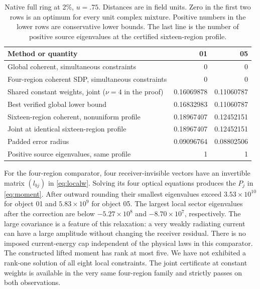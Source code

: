 \documentclass[anonymous,12pt]{iopjournal}
\theoremstyle{remark}\newtheorem{remark}[theorem]{Remark}
\numberwithin{equation}{section}
\begin{document}
\begin{table}[tb]
\caption{Native full ring at 2\%, $u=.75$. Distances are in field units. Zero in the first two rows is an optimum for every unit complex mixture. Positive numbers in the lower rows are conservative lower bounds. The last line is the number of positive source eigenvalues at the certified sixteen-region profile.}\label{tab:compare}
\centering\begin{tabular}{@{}>{\raggedright\arraybackslash}p{.49\linewidth}rr@{}}\toprule
Method or quantity & 01 & 05\\ \midrule
Global coherent, simultaneous constraints &0&0\\
Four-region coherent SDP, simultaneous constraints &0&0\\
Shared constant weights, joint ($\nu=4$ in the proof) &0.16069878&0.11060787\\
Best verified global lower bound &0.16832983&0.11060787\\
Sixteen-region coherent, nonuniform profile &0.18967407&0.12452151\\
Joint at identical sixteen-region profile &0.18967407&0.12452151\\
Padded error radius &0.09096764&0.08802506\\
Positive source eigenvalues, same profile &1&1\\ \bottomrule
\end{tabular}
\end{table}

For the four-region comparator, four receiver-invisible vectors have an invertible matrix $(l_{bj})$ in \eqref{eq:localw}. Solving its four optical equations produces the $P_j$ in \eqref{eq:moment}. After outward rounding their smallest eigenvalues exceed $3.53\times10^{10}$ for object 01 and $5.83\times10^9$ for object 05. The largest local sector eigenvalues after the correction are below $-5.27\times10^8$ and $-8.70\times10^7$, respectively. The large covariance is a feature of this relaxation: a very weakly radiating current can have a large amplitude without changing the receiver residual. There is no imposed current-energy cap independent of the physical laws in this comparator. The constructed lifted moment has rank at most five. We have not exhibited a rank-one solution of all eight local constraints. The joint certificate at constant weights is available in the very same four-region family and strictly passes on both observations.
\end{document}
